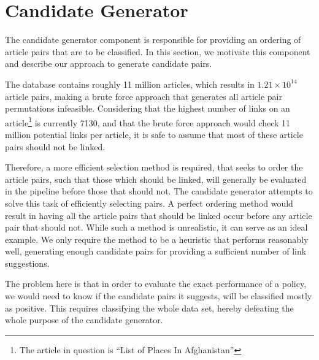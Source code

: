 \section{Candidate Generator}
The candidate generator component is responsible for providing an ordering of article pairs that are to be classified. In this section, we motivate this component and describe our approach to generate candidate pairs.

The database contains roughly 11 million articles, which results in $1.21 \times 10^{14}$ article pairs, making a brute force approach that generates all article pair permutations infeasible. Considering that the highest number of links on an article\footnote{The article in question is \enquote{List of Places In Afghanistan}} is currently 7130, and that the brute force approach would check 11 million potential links per article, it is safe to assume that most of these article pairs should not be linked.

Therefore, a more efficient selection method is required, that seeks to order the article pairs, such that those which should be linked, will generally be evaluated in the pipeline before those that should not. The candidate generator attempts to solve this task of efficiently selecting pairs. A perfect ordering method would result in having all the article pairs that should be linked occur before any article pair that should not. While such a method is unrealistic, it can serve as an ideal example. We only require the method to be a heuristic that performs reasonably well, generating enough candidate pairs for providing a sufficient number of link suggestions. 

The problem here is that in order to evaluate the exact performance of a policy, we would need to know if the candidate pairs it suggests, will be classified mostly as positive. This requires classifying the whole data set, hereby defeating the whole purpose of the candidate generator.




